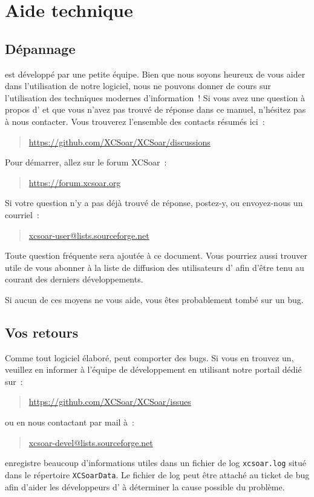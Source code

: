 \section{Aide technique}

\subsection*{Dépannage}
\xc{} est développé par une petite équipe. Bien que nous soyons heureux de vous aider dans 
l'utilisation de notre logiciel, nous ne pouvons donner de cours sur l'utilisation des techniques
modernes d'information~! Si vous avez une question à propos d'\xc{} et que vous n'avez pas 
trouvé de réponse dans ce manuel, n'hésitez pas à nous contacter.
Vous trouverez l'ensemble des contacts résumés ici~:
\begin{quote}
	\url{https://github.com/XCSoar/XCSoar/discussions}
\end{quote}

Pour démarrer, allez sur le forum XCSoar~:
\begin{quote}
	\url{https://forum.xcsoar.org}
\end{quote}
Si votre question n'y a pas déjà trouvé de réponse, postez-y, ou envoyez-nous un courriel~:
\begin{quote}
	\href{mailto:xcsoar-user@lists.sourceforge.net}{xcsoar-user@lists.sourceforge.net}
\end{quote}
Toute question fréquente sera ajoutée à ce document.
Vous pourriez aussi trouver utile de vous abonner à la liste de diffusion des utilisateurs
d'\xc{} afin d'être tenu au courant des derniers développements.

Si aucun de ces moyens ne vous aide, vous êtes probablement tombé sur un bug.

\subsection*{Vos retours}
Comme tout logiciel élaboré, \xc{} peut comporter des bugs. Si vous en trouvez un,
veuillez en informer à l'équipe de développement en utilisant notre portail dédié sur~:
\begin{quote}
\url{https://github.com/XCSoar/XCSoar/issues}
\end{quote}
ou en nous contactant par mail à~:
\begin{quote}
\href{mailto:xcsoar-devel@lists.sourceforge.net}{xcsoar-devel@lists.sourceforge.net}
\end{quote}
\xc{} enregistre beaucoup d'informations utiles dans un fichier de log
\verb|xcsoar.log| situé dans le répertoire \texttt{XCSoarData}. Le fichier de log peut être attaché
au ticket de bug afin d'aider les développeurs d'\xc{} à déterminer la cause possible du problème.

